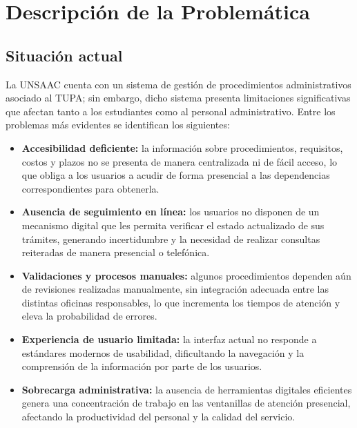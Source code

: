 \section{Descripción de la Problemática}

\subsection{Situación actual}

La UNSAAC cuenta con un sistema de gestión de procedimientos administrativos asociado
al TUPA; sin embargo, dicho sistema presenta limitaciones significativas que afectan
tanto a los estudiantes como al personal administrativo. Entre los problemas más
evidentes se identifican los siguientes:

\begin{itemize}
  \item \textbf{Accesibilidad deficiente:} la información sobre procedimientos,
        requisitos, costos y plazos no se presenta de manera centralizada ni de fácil
        acceso, lo que obliga a los usuarios a acudir de forma presencial a las
        dependencias correspondientes para obtenerla.

  \item \textbf{Ausencia de seguimiento en línea:} los usuarios no disponen de un
        mecanismo digital que les permita verificar el estado actualizado de sus
        trámites, generando incertidumbre y la necesidad de realizar consultas
        reiteradas de manera presencial o telefónica.

  \item \textbf{Validaciones y procesos manuales:} algunos procedimientos dependen aún
        de revisiones realizadas manualmente, sin integración adecuada entre las
        distintas oficinas responsables, lo que incrementa los tiempos de atención y
        eleva la probabilidad de errores.

  \item \textbf{Experiencia de usuario limitada:} la interfaz actual no responde a
        estándares modernos de usabilidad, dificultando la navegación y la comprensión
        de la información por parte de los usuarios.

  \item \textbf{Sobrecarga administrativa:} la ausencia de herramientas digitales
        eficientes genera una concentración de trabajo en las ventanillas de atención
        presencial, afectando la productividad del personal y la calidad del servicio.
\end{itemize}

